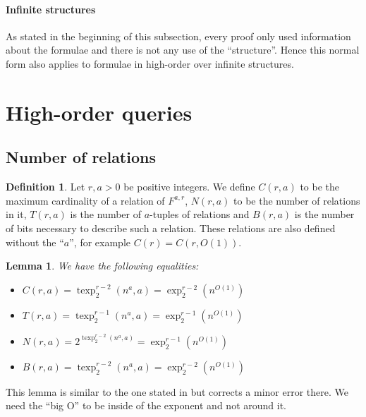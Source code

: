 \documentclass[a4paper,12pt]{article}
\newtheorem{lemma}[theorem]{Lemma}
\theoremstyle{definition}
\newtheorem{definition}[theorem]{Definition}
\DeclareMathOperator{\texp}{texp}
\newcommand{\ex}[1]{\ensuremath{\exp_{2}^{#1}(n^{O(1)})}}
\begin{document}
\paragraph{Infinite structures}
As stated in the beginning of this subsection, every proof only used
information about the formulae and there is not any use of the
``structure''. Hence this normal form also applies to formulae in
high-order over infinite structures.
\section{High-order queries}\label{hoq}
\subsection{Number of relations}
\begin{definition}Let $r,a>0$ be positive integers. We define $C(r,a)$
  to be the maximum cardinality of a relation of $F^{a,r}$, $N(r,a)$
  to be the number of relations in it, $T(r,a)$ is the number of
  $a$-tuples of relations and $B(r,a)$ is the number of bits necessary to
  describe such a relation. These relations are also defined
  without the ``$a$'', for example $C(r)=C(r,O(1))$.\end{definition}
\begin{lemma}
  We have the following equalities:
  \label{size}
  \begin{itemize}
  \item $C(r,a)=\texp^{r-2}_2(n^a,a)=\exp^{r-2}_2(n^{O(1)})$
  \item$T(r,a)=\texp^{r-1}_2(n^a,a)=\exp^{r-1}_2(n^{O(1)})$
  \item $N(r,a)=2^{\texp^{r-2}_2(n^a,a)}=\exp^{r-1}_2(n^{O(1)})$
  \item $B(r,a)=\texp^{r-2}_{2}(n^{a},a)=\ex {r-2}$
  \end{itemize}
\end{lemma}
This lemma is similar to the one stated in \cite{lauri} but corrects a
minor error there. We need the ``big O'' to be inside of the exponent
and not around it. 
\end{document}
